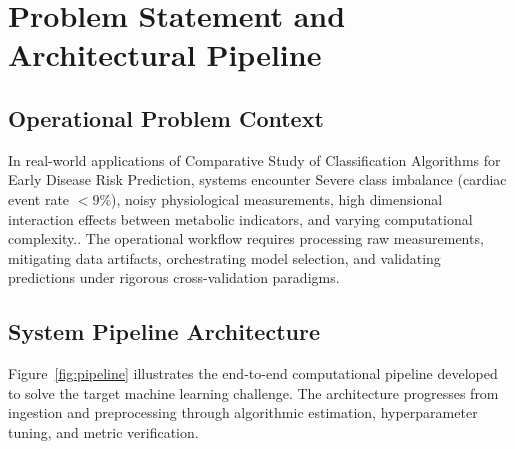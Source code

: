 \section{Problem Statement and Architectural Pipeline}

\subsection{Operational Problem Context}
In real-world applications of Comparative Study of Classification Algorithms for Early Disease Risk Prediction, systems encounter Severe class imbalance (cardiac event rate $< 9\%$), noisy physiological measurements, high dimensional interaction effects between metabolic indicators, and varying computational complexity.. The operational workflow requires processing raw measurements, mitigating data artifacts, orchestrating model selection, and validating predictions under rigorous cross-validation paradigms.

\subsection{System Pipeline Architecture}
Figure~\ref{fig:pipeline} illustrates the end-to-end computational pipeline developed to solve the target machine learning challenge. The architecture progresses from ingestion and preprocessing through algorithmic estimation, hyperparameter tuning, and metric verification.

